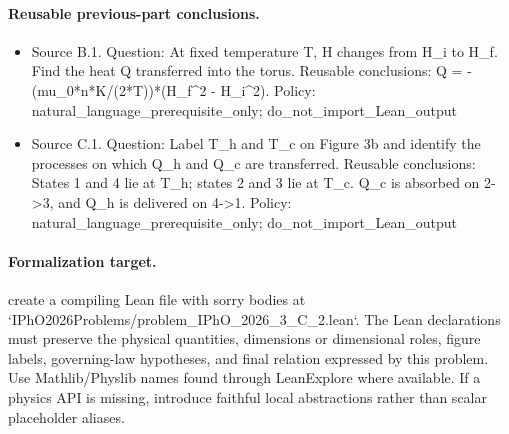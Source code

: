 \paragraph{Reusable previous-part conclusions.}
\begin{itemize}
\item Source B.1. Question: At fixed temperature T, H changes from H\_i to H\_f. Find the heat Q transferred into the torus. Reusable conclusions: Q = -(mu\_0*n*K/(2*T))*(H\_f\textasciicircum{}2 - H\_i\textasciicircum{}2). Policy: natural\_language\_prerequisite\_only; do\_not\_import\_Lean\_output
\item Source C.1. Question: Label T\_h and T\_c on Figure 3b and identify the processes on which Q\_h and Q\_c are transferred. Reusable conclusions: States 1 and 4 lie at T\_h; states 2 and 3 lie at T\_c. Q\_c is absorbed on 2->3, and Q\_h is delivered on 4->1. Policy: natural\_language\_prerequisite\_only; do\_not\_import\_Lean\_output
\end{itemize}

\paragraph{Formalization target.}
create a compiling Lean file with sorry bodies at `IPhO2026Problems/problem\_IPhO\_2026\_3\_C\_2.lean`. The Lean declarations must preserve the physical quantities, dimensions or dimensional roles, figure labels, governing-law hypotheses, and final relation expressed by this problem.
Use Mathlib/Physlib names found through LeanExplore where available. If a physics API is missing, introduce faithful local abstractions rather than scalar placeholder aliases.

